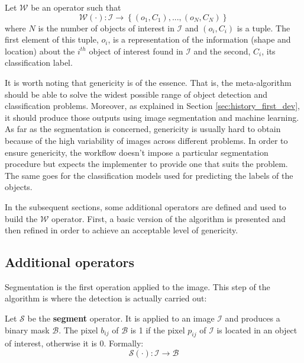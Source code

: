 \begin{definition} Let $\mathcal{W}$ be an operator such that 
	\begin{equation}\label{eqn:workflow_operator}
		\mathcal{W}(\cdot) : \mathcal{I} \rightarrow \left\{(o_1,C_1),...,(o_N, C_N)\right\}
	\end{equation}
	where $N$ is the number of objects of interest in $\mathcal{I}$ and $(o_i, C_i)$ is a tuple. The first element of this tuple, $o_i$, is a representation of the information (shape and location) about the $i^{th}$ object of interest found in $\mathcal{I}$ and the second, $C_i$, its classification label. 
\end{definition}

It is worth noting that genericity is of the essence. That is, the meta-algorithm should be able to solve the widest possible range of object detection and classification problems. Moreover, as explained in Section \ref{sec:history_first_dev}, it should produce those outputs using image segmentation and machine learning. As far as the segmentation is concerned, genericity is usually hard to obtain because of the high variability of images across different problems. In order to ensure genericity, the workflow doesn't impose a particular segmentation procedure but expects the implementer to provide one that suits the problem. The same goes for the classification models used for predicting the labels of the objects. 

In the subsequent sections, some additional operators are defined and used to build the $\mathcal{W}$ operator. First, a basic version of the algorithm is presented and then refined in order to achieve an acceptable level of genericity.

\subsection{Additional operators}
\label{ssec:other_operators}

Segmentation is the first operation applied to the image. This step of the algorithm is where the detection is actually carried out:
 
\begin{definition} \label{def:segmentation_op}
Let $\mathcal{S}$ be the \textbf{segment} operator. It is applied to an image $\mathcal{I}$ and produces a binary mask $\mathcal{B}$. The pixel $b_{ij}$ of $\mathcal{B}$ is 1 if the pixel $p_{ij}$ of $\mathcal{I}$ is located in an object of interest, otherwise it is 0. Formally:
\begin{equation}
	\label{eqn:operator_segment}
	\mathcal{S}(\cdot) : \mathcal{I} \rightarrow \mathcal{B}
\end{equation}
\end{definition}

